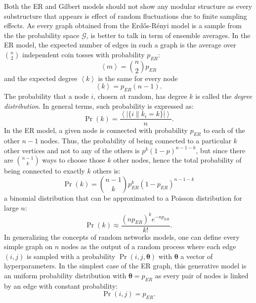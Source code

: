 Both the ER and Gilbert models should not show any modular structure as every substructure that appears is effect of random fluctuations due to finite sampling effects.
As every graph obtained from the Erd\H{o}s-Rényi model is a sample from the the probability space $\mathcal{G}$, is better to talk in term of ensemble averages. In the ER model, the expected number of edges in such a graph is the average over $\binom{n}{2}$ independent coin tosses with probability $p_{ER}$:
\begin{equation}
\left< m  \right> = \binom{n}{2}p_{ER}
\end{equation}
and the expected degree $\left< k \right>$ is the same for every node
\begin{equation}
\left< k \right> = p_{ER}(n-1).
\end{equation}
The probability that a node $i$, chosen at random, has degree $k$ is called the \emph{degree distribution}. In general terms, such probability is expressed as:
\begin{equation}
\Pr(k) = \frac{\left< |\{ i \| k_i=k \}| \right>}{n}.
\end{equation}
In the ER model, a given node is connected with probability $p_{ER}$ to each of the other $n-1$ nodes. Thus, the probability of being connected to a particular $k$ other vertices and not to any of the others is $p^k(1-p)^{n-1-k}$, but since there are $\binom{n-1}{k}$ ways to choose those $k$ other nodes, hence the total probability of being connected to exactly $k$ others is:
\begin{equation}
\Pr(k) = \binom{n-1}{k}p_{ER}^k(1-p_{ER})^{n-1-k}
\end{equation}
a binomial distribution that can be approximated to a Poisson distribution for large $n$:
\begin{equation}
\Pr(k) \approx \frac{(n p_{ER})^k e^{-n p_{ER}} }{k!}.
\end{equation}
\bigbreak
In generalizing the concepts of random networks models, one can define every simple graph on $n$ nodes as the output of a random process where each edge $(i,j) $ is sampled with a probability $\Pr(i,j,{\boldsymbol \theta})$ with $\boldsymbol \theta$ a vector of hyperparameters. In the simplest case of the ER graph, this generative model is an uniform probability distribution with $\boldsymbol \theta=p_{ER}$ as every pair of nodes is linked by an edge with constant probability:
\begin{equation}
\Pr(i,j) = p_{ER}.
\end{equation}

